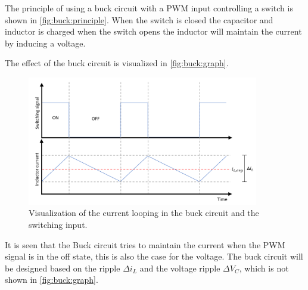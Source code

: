 \documentclass[../report.tex]{subfiles}
\begin{document}
The principle of using a buck circuit with a PWM input controlling a switch is shown in \autoref{fig:buck:principle}. When the switch is closed the capacitor and inductor is charged when the switch opens the inductor will maintain the current by inducing a voltage.

The effect of the buck circuit is visualized in \autoref{fig:buck:graph}.

\begin{figure}[H]
    \centering
         \includegraphics[width=0.90\textwidth]{figures/circuit/buck_graph.png}
     \caption{Visualization of the current looping in the buck circuit and the switching input.}
     \label{fig:buck:graph}
\end{figure}

It is seen that the Buck circuit tries to maintain the current when the PWM signal is in the off state, this is also the case for the voltage. The buck circuit will be designed based on the ripple $\Delta i_L$ and the voltage ripple $\Delta V_C$, which is not shown in \autoref{fig:buck:graph}.
\end{document}
